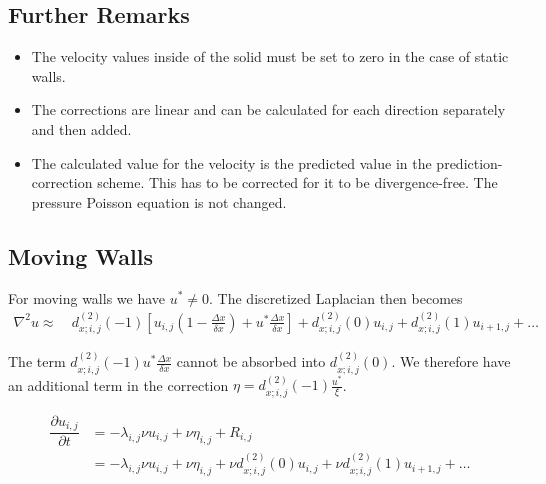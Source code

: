 \documentclass{article}
\numberwithin{equation}{section}
\newcommand{\pd}[2]{\dfrac{\partial #1}{\partial #2}}
\begin{document}
\subsection{Further Remarks}

\begin{itemize}
    \item The velocity values inside of the solid must be set to zero in the case of static walls.
    \item The corrections are linear and can be calculated for each direction separately and then added.
    \item The calculated value for the velocity is the predicted value in the prediction-correction scheme.
    This has to be corrected for it to be divergence-free.
    The pressure Poisson equation is not changed.
\end{itemize}

\subsection{Moving Walls}

For moving walls we have $u^* \ne 0$.
The discretized Laplacian then becomes
\begin{equation}
    \begin{split}
        \nabla^2 u \approx
        \ &d^{(2)}_{x;i,j}(-1) \left[
            u_{i,j} \left(1 - \frac{\Delta x}{\delta x}\right) +
            u^* \frac{\Delta x}{\delta x}
        \right]
        + d^{(2)}_{x;i,j}( 0) u_{i,  j}
        + d^{(2)}_{x;i,j}( 1) u_{i+1,j}
        + \dots
    \end{split}
\end{equation}

The term $d^{(2)}_{x;i,j}(-1) u^* \frac{\Delta x}{\delta x}$ cannot be absorbed into $d^{(2)}_{x;i,j}(0)$.
We therefore have an additional term in the correction $\eta = d^{(2)}_{x;i,j}(-1) \frac{u^*}{\xi}$.

\begin{equation}
    \begin{split}
        \pd{u_{i,j}}{t}
        &= -\lambda_{i,j} \nu u_{i,j} + \nu \eta_{i,j} +  R_{i,j} \\
        &= -\lambda_{i,j} \nu u_{i,j} + \nu \eta_{i,j}
        + \nu d^{(2)}_{x;i,j}( 0) u_{i,  j}
        + \nu d^{(2)}_{x;i,j}( 1) u_{i+1,j}
        + \dots
    \end{split}
\end{equation}
\end{document}
